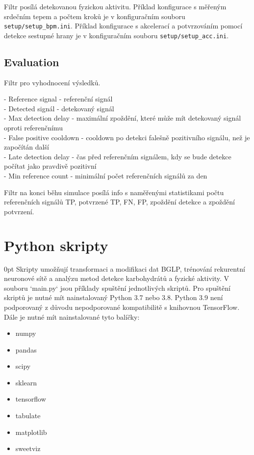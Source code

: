 Filtr posílá detekovanou fyzickou aktivitu.
Příklad konfigurace s měřeným srdečním tepem a počtem kroků je v konfiguračním souboru \texttt{setup/setup\_bpm.ini}. Příklad konfigurace s akcelerací a potvrzováním pomocí detekce sestupné hrany je v konfiguračním souboru \texttt{setup/setup\_acc.ini}.

\subsection*{Evaluation}

Filtr pro vyhodnocení výsledků.

\noindent- Reference signal - referenční signál\\
- Detected signál - detekovaný signál\\
- Max detection delay - maximální zpoždění, které může mít detekovaný signál oproti referenčnímu\\
- False positive cooldown - cooldown po detekci falešně pozitivního signálu, než je započítán další\\
- Late detection delay - čas před referenčním signálem, kdy se bude detekce počítat jako pravdivě pozitivní\\
- Min reference count - minimální počet referenčních signálů za den

Filtr na konci běhu simulace posílá info s naměřenými statistikami počtu referenčních signálů TP, potvrzené TP, FN, FP, zpoždění detekce a zpoždění potvrzení.


\section*{Python skripty}

\begin{setlength}{\parskip}{0pt}
Skripty umožňují transformaci a modifikaci dat BGLP, trénování rekurentní neuronové sítě a analýzu metod detekce karbohydrátů a fyzické aktivity. V souboru `main.py` jsou příklady spuštění jednotlivých skriptů.
Pro spuštění skriptů je nutné mít nainstalovaný Python 3.7 nebo 3.8. Python 3.9 není podporovaný z důvodu nepodporované kompatibilitě s knihovnou TensorFlow. Dále je nutné mít nainstalované tyto balíčky:

\begin{itemize}
\setlength\itemsep{0em}
\item numpy
\item pandas
\item scipy
\item sklearn
\item tensorflow
\item tabulate
\item matplotlib
\item sweetviz
\end{itemize}
\end{setlength}

